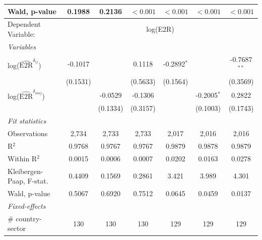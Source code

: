 \documentclass[a4paper]{article}
\begin{document}
\begin{table}[h!]
\begin{tabular}{lcccccc}
       Wald, p-value & 0.1988                & 0.2136                 & $<0.001$  & $<0.001$  & $<0.001$   & $<0.001$ \\ 
      \midrule
            Dependent Variable: & \multicolumn{6}{c}{log(E2R)}\\ \cmidrule(lr){2-7}
       \emph{Variables}\\
      log($\hat{\text{E2R}}^{\delta_{ij}}$)        & -0.1017               &                        & 0.1118                & -0.2892$^{*}$         &                        & -0.7687$^{**}$\\   
                                & (0.1531)              &                        & (0.5633)              & (0.1564)              &                        & (0.3569)\\   
      log($\hat{\text{E2R}}^{\delta_{oiuj}}$)             &                       & -0.0529                & -0.1306               &                       & -0.2005$^{*}$          & 0.2822\\   
                                &                       & (0.1334)               & (0.3157)              &                       & (0.1003)               & (0.1743)\\  
      \emph{Fit statistics}\\
      Observations              & 2,734                 & 2,733                  & 2,733                 & 2,017                 & 2,016                  & 2,016\\  
      R$^2$                     & 0.9768                & 0.9767                 & 0.9767                & 0.9879                & 0.9878                 & 0.9879\\  
      Within R$^2$              & 0.0015                & 0.0006                 & 0.0007                & 0.0202                & 0.0163                 & 0.0278\\  
      Kleibergen-Paap, F-stat.                     & 0.4409                & 0.1569                 & 0.2861                & 3.421                 & 3.989                  & 4.301\\
      Wald, p-value & 0.5067                & 0.6920                 & 0.7512                & 0.0645                & 0.0459                 & 0.0137\\ 
      \midrule
      \emph{Fixed-effects}\\
      \# country-sector         & 130                   & 130                    & 130                    & 129                    & 129                    & 129\\  

\end{tabular}
\end{table}
\end{document}
